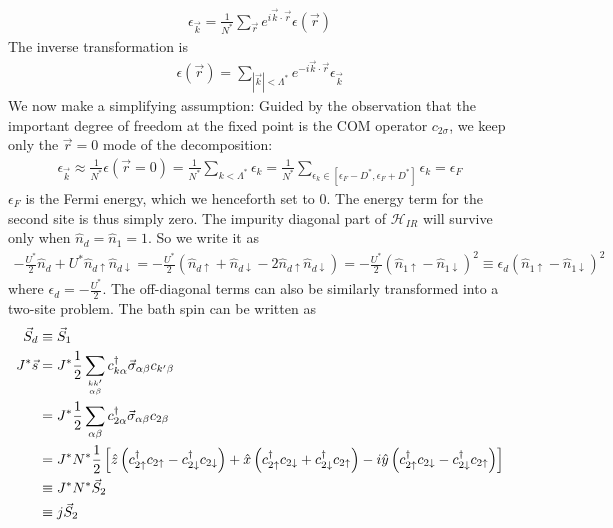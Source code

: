 \documentclass[twoside]{report}
\numberwithin{equation}{section}
\begin{document}
\begin{equation}\begin{aligned}
	\epsilon_{\vec{k}} = \frac{1}{N^*}\sum_{\vec r}e^{i \vec{k}\cdot\vec{r}}\epsilon(\vec r)
\end{aligned}\end{equation}
The inverse transformation is
\begin{equation}\begin{aligned}
	\epsilon(\vec r) = \sum_{|\vec k| < \Lambda^*}e^{-i \vec{k}\cdot\vec{r}}\epsilon_{\vec{k}}
\end{aligned}\end{equation}
We now make a simplifying assumption: Guided by the observation that the important degree of freedom at the fixed point is the COM operator \(c_{2\sigma}\), we keep only the \(\vec r=0\) mode of the decomposition:
\begin{equation}\begin{aligned}
	\epsilon_{\vec k} \approx \frac{1}{N^*}\epsilon(\vec r=0) = \frac{1}{N^*}\sum_{k<\Lambda^*}\epsilon_k = \frac{1}{N^*}\sum_{\epsilon_k \in [\epsilon_F - D^*, \epsilon_F + D^*]}\epsilon_k = \epsilon_F
\end{aligned}\end{equation}
\(\epsilon_F\) is the Fermi energy, which we henceforth set to 0. The energy term for the second site is thus simply zero. The impurity diagonal part of \(\mathcal{H}_{IR}\) will survive only when \(\hat n_d = \hat n_1 = 1\). So we write it as
\begin{equation}\begin{aligned}
	- \frac{U^*}{2}\hat n_d + U^* \hat n_{d\uparrow}\hat n_{d\downarrow} = - \frac{U^*}{2}\left(\hat n_{d\uparrow} + \hat n_{d \downarrow} - 2\hat n_{d\uparrow}\hat n_{d\downarrow}\right) = - \frac{U^*}{2} \left(\hat n_{1 \uparrow} - \hat n_{1 \downarrow}\right)^2 \equiv \epsilon_d \left(\hat n_{1 \uparrow} - \hat n_{1 \downarrow}\right)^2
\end{aligned}\end{equation}
where \(\epsilon_d = - \frac{U^*}{2}\). The off-diagonal terms can also be similarly transformed into a two-site problem. The bath spin can be written as
\begin{equation}\begin{aligned}
	\vec S_d &\equiv \vec S_1\\
	J^*\vec s &= J^* \frac{1}{2}\sum_{kk^\prime\atop{\alpha\beta}}c^\dagger_{k\alpha}\vec \sigma_{\alpha\beta}c_{k^\prime\beta} \\
	       &= J^*\frac{1}{2}\sum_{\alpha\beta}c^\dagger_{2\alpha}\vec \sigma_{\alpha\beta}c_{2\beta} \\
	       &= J^* N^* \frac{1}{2}\left[\hat z\left(c^\dagger_{2 \uparrow}c_{2 \uparrow} - c^\dagger_{2 \downarrow} c_{2 \downarrow} \right) + \hat x \left(c^\dagger_{2 \uparrow}c_{2 \downarrow} + c^\dagger_{2 \downarrow} c_{2 \uparrow} \right) -i \hat y \left( c^\dagger_{2 \uparrow}c_{2 \downarrow} - c^\dagger_{2 \downarrow} c_{2 \uparrow} \right)\right]\\
	       &\equiv J^*N^* \vec S_2\\
	       &\equiv j \vec S_2\\
\end{aligned}\end{equation}
\end{document}
